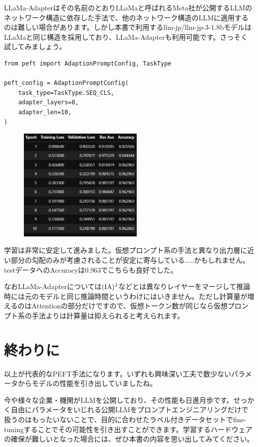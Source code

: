 \documentclass[a5paper,twoside,dvipdfmx]{jsarticle}
\begin{document}
LLaMa-Adapterはその名前のとおりLLaMaと呼ばれるMeta社が公開するLLMのネットワーク構造に依存した手法で、他のネットワーク構造のLLMに適用するのは難しい場合があります。しかし本書で利用するllm-jp/llm-jp-3-1.8bモデルはLLaMaと同じ構造を採用しており、LLaMa-Adapterも利用可能です。さっそく試してみましょう。

\begin{lstlisting}
from peft import AdaptionPromptConfig, TaskType

peft_config = AdaptionPromptConfig(
    task_type=TaskType.SEQ_CLS,
    adapter_layers=8,
    adapter_len=10,
)
\end{lstlisting}



\begin{figure}[h]
  \centering
  \includegraphics[width=60mm]{../C105Fig/gray/llama_adapter_train.png}
 \end{figure} 

学習は非常に安定して進みました。仮想プロンプト系の手法と異なり出力層に近い部分の勾配のみが考慮されることが安定に寄与している……かもしれません。testデータへのAccuracyは0.963でこちらも良好でした。

なおLLaMa-Adapterについては$\rm{(IA)^3}$などとは異なりレイヤーをマージして推論時には元のモデルと同じ推論時間というわけにはいきません。ただし計算量が増えるのはAttentionの部分だけですので、仮想トークン数が同じなら仮想プロンプト系の手法よりは計算量は抑えられると考えられます。

\newpage

\section{終わりに}

以上が代表的なPEFT手法になります。いずれも興味深い工夫で数少ないパラメータからモデルの性能を引き出していましたね。

今や様々な企業・機関がLLMを公開しており、その性能も日進月歩です。せっかく自由にパラメータをいじれる公開LLMをプロンプトエンジニアリングだけで扱うのはもったいないことで、目的に合わせたラベル付きデータセットでfine-tuningすることでその可能性を引き出すことができます。学習するハードウェアの確保が難しいとなった場合には、ぜひ本書の内容を思い出してみてください。
\end{document}
